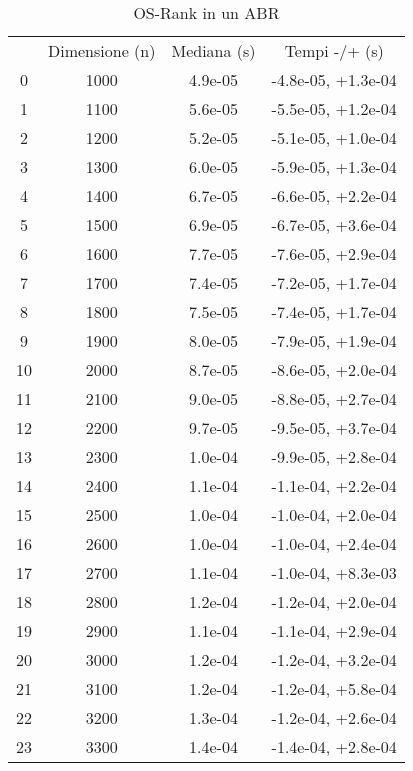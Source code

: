 \begin{table}
\centering
\caption{OS-Rank in un ABR}
\label{OS-Rank in un ABR}
\begin{adjustbox}{width=1\textwidth/2}
\begin{tabular}{|c|c|c|c|}
\hline
 & Dimensione (n) & Mediana (s) & Tempi -/+ (s) \\
0 & 1000 & 4.9e-05 & -4.8e-05, +1.3e-04 \\
\cline{1-4}
1 & 1100 & 5.6e-05 & -5.5e-05, +1.2e-04 \\
\cline{1-4}
2 & 1200 & 5.2e-05 & -5.1e-05, +1.0e-04 \\
\cline{1-4}
3 & 1300 & 6.0e-05 & -5.9e-05, +1.3e-04 \\
\cline{1-4}
4 & 1400 & 6.7e-05 & -6.6e-05, +2.2e-04 \\
\cline{1-4}
5 & 1500 & 6.9e-05 & -6.7e-05, +3.6e-04 \\
\cline{1-4}
6 & 1600 & 7.7e-05 & -7.6e-05, +2.9e-04 \\
\cline{1-4}
7 & 1700 & 7.4e-05 & -7.2e-05, +1.7e-04 \\
\cline{1-4}
8 & 1800 & 7.5e-05 & -7.4e-05, +1.7e-04 \\
\cline{1-4}
9 & 1900 & 8.0e-05 & -7.9e-05, +1.9e-04 \\
\cline{1-4}
10 & 2000 & 8.7e-05 & -8.6e-05, +2.0e-04 \\
\cline{1-4}
11 & 2100 & 9.0e-05 & -8.8e-05, +2.7e-04 \\
\cline{1-4}
12 & 2200 & 9.7e-05 & -9.5e-05, +3.7e-04 \\
\cline{1-4}
13 & 2300 & 1.0e-04 & -9.9e-05, +2.8e-04 \\
\cline{1-4}
14 & 2400 & 1.1e-04 & -1.1e-04, +2.2e-04 \\
\cline{1-4}
15 & 2500 & 1.0e-04 & -1.0e-04, +2.0e-04 \\
\cline{1-4}
16 & 2600 & 1.0e-04 & -1.0e-04, +2.4e-04 \\
\cline{1-4}
17 & 2700 & 1.1e-04 & -1.0e-04, +8.3e-03 \\
\cline{1-4}
18 & 2800 & 1.2e-04 & -1.2e-04, +2.0e-04 \\
\cline{1-4}
19 & 2900 & 1.1e-04 & -1.1e-04, +2.9e-04 \\
\cline{1-4}
20 & 3000 & 1.2e-04 & -1.2e-04, +3.2e-04 \\
\cline{1-4}
21 & 3100 & 1.2e-04 & -1.2e-04, +5.8e-04 \\
\cline{1-4}
22 & 3200 & 1.3e-04 & -1.2e-04, +2.6e-04 \\
\cline{1-4}
23 & 3300 & 1.4e-04 & -1.4e-04, +2.8e-04 \\

\end{tabular}
\end{adjustbox}
\end{table}
